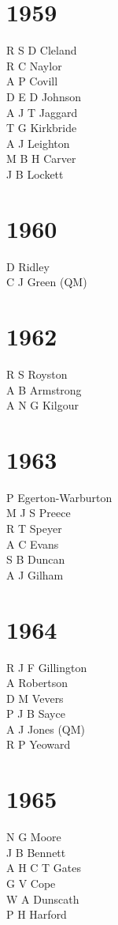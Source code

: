 \begin{multicols}{2}
  \section*{1959}
  R S D Cleland \\
  R C Naylor \\
  A P Covill \\
  D E D Johnson \\
  A J T Jaggard \\
  T G Kirkbride \\
  A J Leighton \\
  M B H Carver \\
  J B Lockett \\
  \section*{1960}
  D Ridley \\
  C J Green (QM) \\
  \section*{1962}
  R S Royston \\
  A B Armstrong \\
  A N G Kilgour \\
  \section*{1963}
  P Egerton-Warburton \\
  M J S Preece \\
  R T Speyer \\
  A C Evans \\
  S B Duncan \\
  A J Gilham \\
  \section*{1964}
  R J F Gillington \\
  A Robertson \\
  D M Vevers \\
  P J B Sayce \\
  A J Jones (QM) \\
  R P Yeoward \\
  \section*{1965}
  N G Moore \\
  J B Bennett \\
  A H C T Gates \\
  G V Cope \\
  W A Dunscath \\
  P H Harford \\

\end{multicols}
